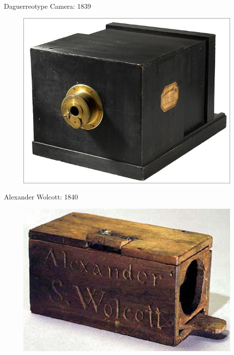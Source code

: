 \documentclass{beamer}
\begin{document}
\begin{frame}{Daguerreotype Camera: 1839}
	\begin{figure}
		\centering
		\includegraphics[scale=0.4]{121.jpg}
	\end{figure}
\end{frame}

\begin{frame}{Alexander Wolcott: 1840}
	\begin{figure}
		\centering
		\includegraphics[scale=0.4]{123.jpg}
	\end{figure}
\end{frame}
\end{document}
